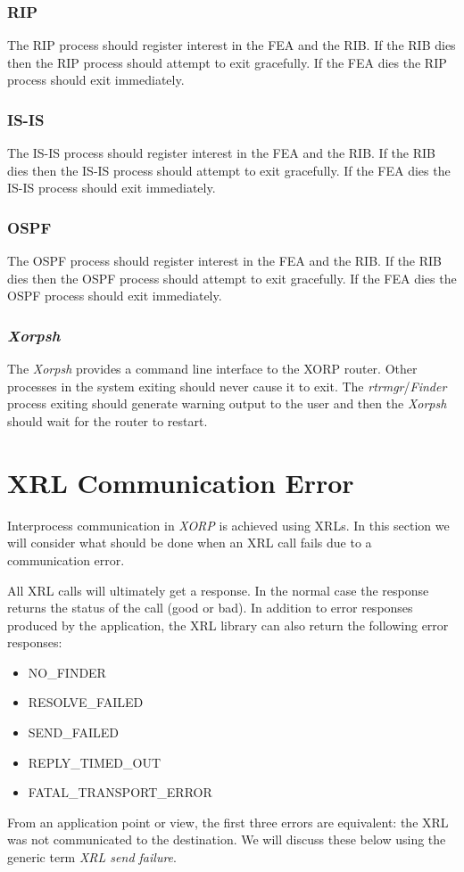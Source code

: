 \documentclass[11pt]{article}
\makeatletter
\newcommand{\xorp} {{\em XORP}\@\xspace}
\newcommand{\finder} {{\em Finder}\@\xspace}
\newcommand{\xorpsh} {{\em Xorpsh}\@\xspace}
\newcommand{\rtrmgr} {{\em rtrmgr}\@\xspace}
\makeatother
\begin{document}
\subsubsection{RIP}

The RIP process should register interest in the FEA and the RIB. If
the RIB dies then the RIP process should attempt to exit gracefully.
If the FEA dies the RIP process should exit immediately.

\subsubsection{IS-IS}

The IS-IS process should register interest in the FEA and the RIB. If
the RIB dies then the IS-IS process should attempt to exit gracefully.
If the FEA dies the IS-IS process should exit immediately.

\subsubsection{OSPF}

The OSPF process should register interest in the FEA and the RIB. If
the RIB dies then the OSPF process should attempt to exit gracefully.
If the FEA dies the OSPF process should exit immediately.

\subsubsection{\label{xorpsh}\xorpsh}

The \xorpsh provides a command line interface to the XORP router.
Other processes in the system exiting should never cause it to
exit. The \rtrmgr/\finder process exiting should generate
warning output to the user and then the \xorpsh should wait for the
router to restart.

\section{XRL Communication Error}
Interprocess communication in \xorp is achieved using XRLs. In this
section we will consider what should be done when an XRL call fails
due to a communication error.

All XRL calls will ultimately get a response. In the normal case the
response returns the status of the call (good or bad). In addition to
error responses produced by the application, the XRL library can also
return the following error responses:
\begin{itemize}
\item NO\_FINDER
\item RESOLVE\_FAILED
\item SEND\_FAILED
\item REPLY\_TIMED\_OUT
\item FATAL\_TRANSPORT\_ERROR
\end{itemize}
From an application point or view, the first three errors are
equivalent: the XRL was not communicated to the destination.  We will
discuss these below using the generic term {\em XRL send failure}.
\end{document}

